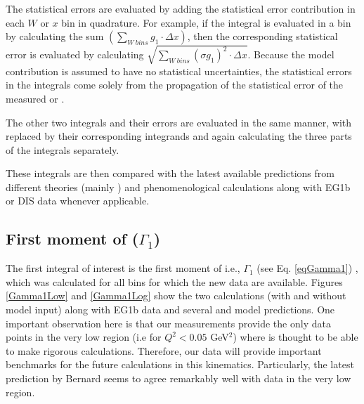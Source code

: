 The statistical errors are evaluated by adding the statistical error contribution in each $W$ or $x$ bin in quadrature. For example, if the integral is evaluated in a \qsqs bin by calculating the sum $\left( \sum\limits_{W ~bins} g_1 \cdot \Delta x \right) $, then the corresponding statistical error is evaluated by calculating %
$\sqrt{ \sum\limits_{W ~bins} (\sigma g_1)^2 \cdot \Delta x  }$. %
Because the model contribution is assumed to have no statistical uncertainties, the statistical errors in the integrals come solely from the propagation of the statistical error of the measured \gones or \afone.

The other two integrals and their errors are evaluated in the same manner, with \gones replaced by their corresponding integrands and again calculating the three parts of the integrals separately. 

 These integrals are then compared with the latest available predictions from different theories (mainly \chipt) and phenomenological calculations along with EG1b or DIS data whenever applicable.


\subsection{First moment of \gones ($\Gamma_1$)}
The first integral of interest is %
the first moment of \gones i.e., $\Gamma_1$ (see Eq. \ref{eqGamma1}) , which was calculated for all %
\qsqs bins for which the new data are %
available. Figures \ref{Gamma1Low} and \ref{Gamma1Log} show the two calculations (with and without model input) along with EG1b data and several \chipts and model predictions. One important observation here is that our measurements provide the only data points in %
the very low \qsqs region (i.e for $Q^2<0.05$ GeV$^2$) where \chipts is thought to be able to make %
rigorous calculations. Therefore, our data will provide important benchmarks for the future calculations in this kinematics. Particularly, the latest \chipts prediction by Bernard \etal \cite{BEKM13} seems to agree remarkably well with data in %
the very low \qsqs region.

